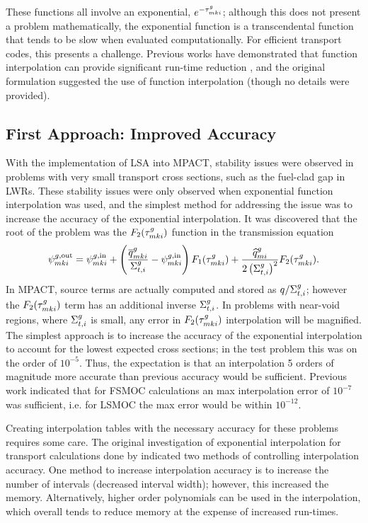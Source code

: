 {{    These functions all involve an exponential, $e^{-\segopt}$; although this does not present a problem mathematically, the exponential function is a transcendental function that tends to be slow when evaluated computationally.
    For efficient transport codes, this presents a challenge.
    Previous works have demonstrated that function interpolation can provide significant run-time reduction \cite{Yamamoto2004}, and the original formulation \cite{Ferrer2016} suggested the use of function interpolation (though no details were provided).

    \subsection{First Approach: Improved Accuracy}{\label{ssec:LSMOC:ET:First Approach: Improved Accuracy}
      With the implementation of \ac{LSA} into MPACT, stability issues were observed in problems with very small transport cross sections, such as the fuel-clad gap in \acp{LWR}.
      These stability issues were only observed when exponential function interpolation was used, and the simplest method for addressing the issue was to increase the accuracy of the exponential interpolation.
      It was discovered that the root of the problem was the $F_2(\segopt)$ function in the transmission equation
      \begin{equation}\label{eq:LSMOC:ET:Transmission Original}
        \afluxout = \afluxin
                  + \left(\frac{\tsrcF}{\xst}-\afluxin\right)F_1(\segopt)
                  + \frac{\tsrcL}{2\left(\xst\right)^2}F_2(\segopt).
      \end{equation}
      In MPACT, source terms are actually computed and stored as $q/\xst$; however the $F_2(\segopt)$ term has an additional inverse $\xst$.
      In problems with near-void regions, where $\xst$ is small, any error in $F_2(\segopt)$ interpolation will be magnified.
      The simplest approach is to increase the accuracy of the exponential interpolation to account for the lowest expected cross sections; in the test problem this was on the order of $10^{-5}$.
      Thus, the expectation is that an interpolation 5 orders of magnitude more accurate than previous accuracy would be sufficient.
      Previous work \cite{Yamamoto2004} indicated that for \ac{FSMOC} calculations an max interpolation error of $10^{-7}$ was sufficient, i.e. for \ac{LSMOC} the max error would be within $10^{-12}$.

      Creating interpolation tables with the necessary accuracy for these problems requires some care.
      The original investigation of exponential interpolation for transport calculations  done by \citet{Yamamoto2004} indicated two methods of controlling interpolation accuracy.
      One method to increase interpolation accuracy is to increase the number of intervals (decreased interval width); however, this increased the memory.
      Alternatively, higher order polynomials can be used in the interpolation, which overall tends to reduce memory at the expense of increased run-times.

}}}
